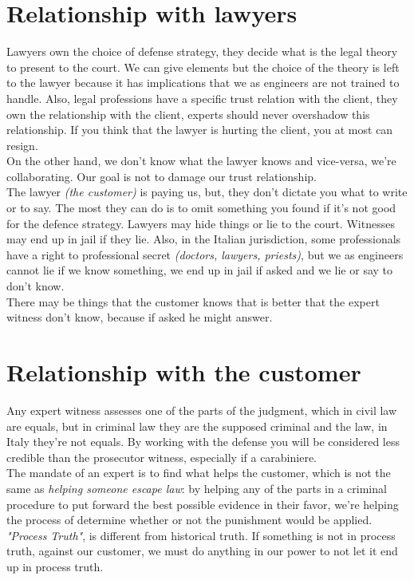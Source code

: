    \section{Relationship with lawyers}
        Lawyers own the choice of defense strategy, they decide what is the legal theory to present to the court. We can give elements but the choice of the theory is left to the lawyer because it has implications that we as engineers are not trained to handle. Also, legal professions have a specific trust relation with the client, they own the relationship with the client, experts should never overshadow this relationship. If you think that the lawyer is hurting the client, you at most can resign.\\
        On the other hand, we don't know what the lawyer knows and vice-versa, we're collaborating. Our goal is not to damage our trust relationship.\\
        The lawyer \textit{(the customer)} is paying us, but, they don't dictate you what to write or to say. The most they can do is to omit something you found if it's not good for the defence strategy. Lawyers may hide things or lie to the court. Witnesses may end up in jail if they lie. Also, in the Italian jurisdiction, some professionals have a right to professional secret \textit{(doctors, lawyers, priests)}, but we as engineers cannot lie if we know something, we end up in jail if asked and we lie or say to don't know.\\
        There may be things that the customer knows that is better that the expert witness don't know, because if asked he might answer.
    \section{Relationship with the customer}
        Any expert witness assesses one of the parts of the judgment, which in civil law are equals, but in criminal law they are the supposed criminal and the law, in Italy they're not equals. By working with the defense you will be considered less credible than the prosecutor witness, especially if a carabiniere.\\
        The mandate of an expert is to find what helps the customer, which is not the same as \textit{helping someone escape law}: by helping any of the parts in a criminal procedure to put forward the best possible evidence in their favor, we're helping the process of determine whether or not the punishment would be applied.\\ 
        \textit{"Process Truth"}, is different from historical truth. If something is not in process truth, against our customer, we must do anything in our power to not let it end up in process truth. 
